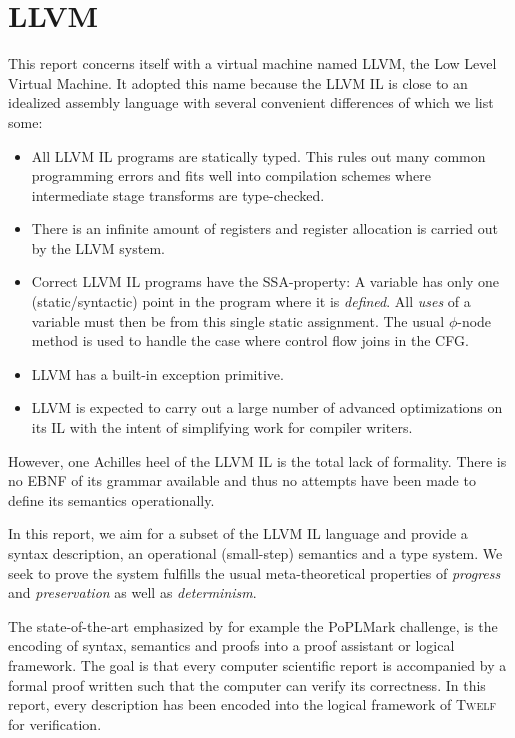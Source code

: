 \documentclass[a4paper, oneside, 10pt, draft]{memoir}
\newcommand{\twelf}{\textsc{Twelf}}
\begin{document}
\section{LLVM}

This report concerns itself with a virtual machine named LLVM, the Low
Level Virtual Machine. It adopted this name because the LLVM IL is
close to an idealized assembly language with several convenient
differences of which we list some:
\begin{itemize}
\item All LLVM IL programs are statically typed. This rules out many
  common programming errors and fits well into compilation schemes
  where intermediate stage transforms are type-checked.
\item There is an infinite amount of registers and register allocation
  is carried out by the LLVM system.
\item Correct LLVM IL programs have the SSA-property: A variable has
  only one (static/syntactic) point in the program where it is
  \emph{defined}. All \emph{uses} of a variable must then be from this
  single static assignment. The usual $\phi$-node method is used to
  handle the case where control flow joins in the CFG.
\item LLVM has a built-in exception primitive.
\item LLVM is expected to carry out a large number of advanced
  optimizations on its IL with the intent of simplifying work for
  compiler writers.
\end{itemize}

However, one Achilles heel of the LLVM IL is the total lack of
formality. There is no EBNF of its grammar available and thus no
attempts have been made to define its semantics operationally.

In this report, we aim for a subset of the LLVM IL language and
provide a syntax description, an operational (small-step) semantics and a type
system. We seek to prove the system fulfills the usual meta-theoretical
properties of \emph{progress} and \emph{preservation} as well as
\emph{determinism}.

The state-of-the-art emphasized by for example the PoPLMark
challenge\cite{aydemir:2005:mechanizedmetatheory}, is the encoding of
syntax, semantics and proofs into a proof assistant or logical
framework. The goal is that every computer scientific report is
accompanied by a formal proof written such that the computer can
verify its correctness. In this report, every description has been
encoded into the logical framework of
\twelf{}\cite{schurmann.pfenning:twelf} for verification.
\end{document}
